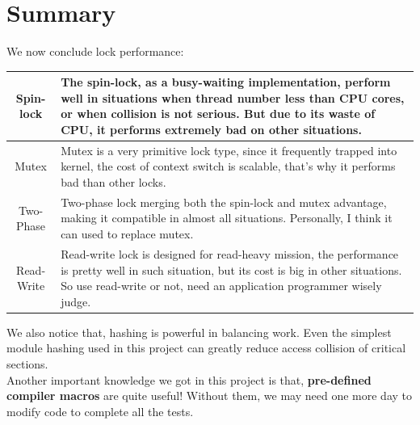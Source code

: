 \documentclass{article}
\begin{document}
\section{Summary}
We now conclude lock performance:
\begin{center}
\begin{tabular}{c|p{}}
\hline
Spin-lock&
The spin-lock, as a busy-waiting implementation, perform well in situations when thread number less than CPU cores, or when collision is not serious. But due to its waste of CPU, it performs extremely bad on other situations.\\
\hline
Mutex&
Mutex is a very primitive lock type, since it frequently trapped into kernel, the cost of context switch is scalable, that's why it performs bad than other locks.\\
\hline
Two-Phase&
Two-phase lock merging both the spin-lock and mutex advantage, making it compatible in almost all situations. Personally, I think it can used to replace mutex.\\
\hline
Read-Write&
Read-write lock is designed for read-heavy mission, the performance is pretty well in such situation, but its cost is big in other situations. So use read-write or not, need an application programmer wisely judge.\\
\hline
\end{tabular}
\end{center}
We also notice that, hashing is powerful in balancing work. Even the simplest module hashing used in this project can greatly reduce access collision of critical sections.\\ Another important knowledge we got in this project is that, \textbf{pre-defined compiler macros} are quite useful! Without them, we may need one more day to modify code to complete all the tests.
\end{document}
